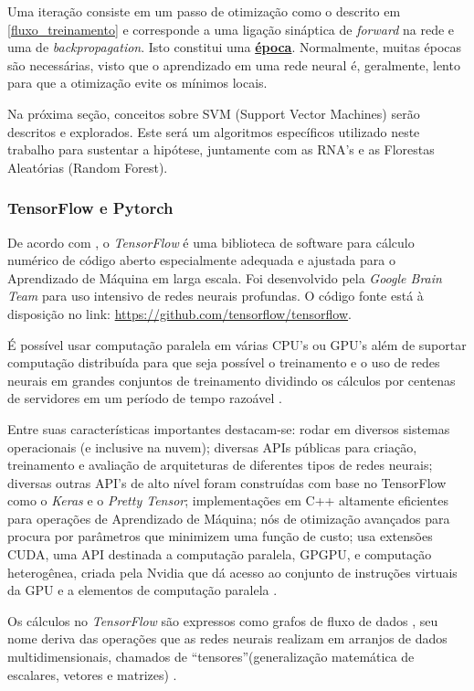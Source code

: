 Uma iteração consiste em um passo de otimização como o descrito em \ref{fluxo_treinamento} e corresponde a uma ligação sináptica de \textit{forward} na rede e uma de \textit{backpropagation}. Isto constitui uma \textbf{\underline{época}}. Normalmente, muitas épocas são necessárias, visto que o aprendizado em uma rede neural é, geralmente, lento para que a otimização evite os mínimos locais.

Na próxima seção, conceitos sobre SVM (Support Vector Machines) serão descritos e explorados. Este será um algoritmos específicos utilizado neste trabalho para sustentar a hipótese, juntamente com as RNA's e as Florestas Aleatórias (Random Forest).

\subsubsection{TensorFlow e Pytorch}
De acordo com , o \textit{TensorFlow} é uma biblioteca de software para cálculo numérico de código aberto especialmente adequada e ajustada para o Aprendizado de Máquina em larga escala. Foi desenvolvido pela \textit{Google Brain Team} para uso intensivo de redes neurais profundas. O código fonte está à disposição no link: \url{https://github.com/tensorflow/tensorflow}.

É possível usar computação paralela em várias CPU's ou GPU's além de suportar computação distribuída para que seja possível o treinamento e o uso de redes neurais em grandes conjuntos de treinamento dividindo os cálculos por centenas de servidores em um período de tempo razoável \cite{geron_maos_2020}. 

Entre suas características importantes destacam-se: rodar em diversos sistemas operacionais (e inclusive na nuvem); diversas APIs públicas para criação, treinamento e avaliação de arquiteturas de diferentes tipos de redes neurais; diversas outras API's de alto nível foram construídas com base no TensorFlow como o \textit{Keras} e o \textit{Pretty Tensor}; implementações em C++ altamente eficientes para operações de Aprendizado de Máquina; nós de otimização avançados para procura por parâmetros que minimizem uma função de custo; usa extensões CUDA, uma  API destinada a computação paralela, GPGPU, e computação heterogênea, criada pela Nvidia que dá acesso ao conjunto de instruções virtuais da GPU e a elementos de computação paralela \cite{geron_maos_2020}.

Os cálculos no \textit{TensorFlow} são expressos como grafos de fluxo de dados , seu nome deriva das operações que as redes neurais realizam em arranjos de dados multidimensionais, chamados de ``tensores''(generalização matemática de escalares, vetores e matrizes) \cite{kadimisetty_tensorflow_2018}.

